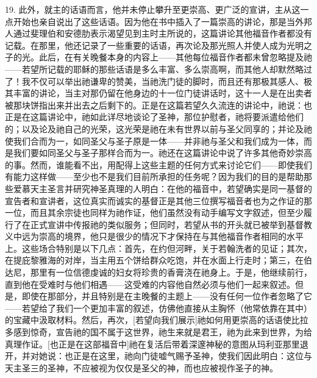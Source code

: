 19. 此外，就主的话语而言，他并未停止攀升至更崇高、更广泛的宣讲，主从这一点开始也亲自说出了这些话语。因为他在书中插入了一篇崇高的讲论，那是当外邦人通过斐理伯和安德肋表示渴望见到主时主所说的，这篇讲论其他福音作者都没有记载。在那里，他还记录了一些重要的话语，再次论及那光照人并使人成为光明之子的光。此后，在有关晚餐本身的内容上——其他每位福音作者都未曾忽略提及祂——若望所记载的耶稣的那些话语是多么丰富、多么崇高啊，而其他人却默然略过了！我不仅可以举出祂谦卑的赞美，当祂洗门徒的脚时，而且还有那极其感人、极其丰富的讲论，当主对那仍留在他身边的十一位门徒讲话时，这十一人是在出卖者被那块饼指出来并出去之后剩下的。正是在这篇若望久久流连的讲论中，祂说：也正是在这篇讲论中，祂如此详尽地谈论了圣神，那位护慰者，祂将要派遣给他们的；以及论及祂自己的光荣，这光荣是祂在未有世界以前与圣父同享的；并论及祂使我们合而为一，如同圣父与圣子原是一体——并非祂与圣父和我们成为一体，而是我们要如同圣父与圣子那样合而为一。祂还在这篇讲论中说了许多其他奇妙崇高的事。然而，谁能看不出，用配得上这些主题的任何方式来讨论它们——即使我们有能力这样做——至少也不是我们目前所承担的任务呢？因为我们的目的是帮助那些爱慕天主圣言并研究神圣真理的人明白：在他的福音中，若望确实是同一基督的宣告者和宣讲者，这位真实而诚实的基督正是其他三位撰写福音者也为之作证的那一位，而且其余宗徒也同样为祂作证，他们虽然没有动手编写文字叙述，但至少履行了在正式宣讲中传报祂的类似服务；但同时，若望从书的开头就已被举到基督教义中远为崇高的境界，他只是很少的情况下才保持在与其他福音作者相同的水平上。这些场合特别是以下几点：首先，在约但河畔，关于若翰洗者的见证；其次，在提庇黎雅海的对岸，当主用五个饼给群众吃饱，并在水面上行走时；第三，在伯达尼，那里有一位信德虔诚的妇女将珍贵的香膏浇在祂身上。于是，他继续前行，直到他在受难时与他们相遇——这受难的内容他自然必须与他们一起来叙述。但是，即使在那部分，并且特别是在主晚餐的主题上——没有任何一位作者忽略了它——若望给了我们一个更加丰富的叙述，仿佛他直接从主胸怀（他常依靠在其中）的宝藏中汲取材料。然后，再次，[若望向我们展示]祂如何用更崇高的话语使比拉多感到惊奇，宣告祂的国不属于这世界，祂生来就是君王，祂为此来到世界，为给真理作证。[也正是在这部福音中]祂在复活后带着深邃神秘的意图从玛利亚那里退开，并对她说：也正是在这里，祂向门徒嘘气赐予圣神，使我们因此明白：这位与天主圣三的圣神，不应被视为仅仅是圣父的神，而也应被视作圣子的神。\par

